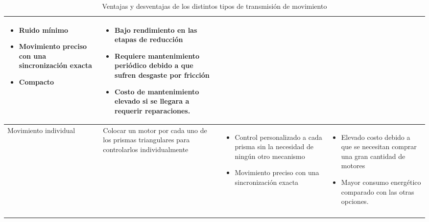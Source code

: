 \begin{center}
\begin{longtable}[!htb]{| m{5em} | m{12em} | m{12em}| m{12em}|}
\begin{itemize}
        \item Ruido mínimo
        \item Movimiento preciso con una sincronización exacta
        \item Compacto
    \end{itemize}
    & 
    \begin{itemize}
        \item Bajo rendimiento en las etapas de reducción
        \item Requiere mantenimiento periódico debido a que sufren desgaste por fricción
        \item Costo de mantenimiento elevado si se llegara a requerir reparaciones.
    \end{itemize}\\
    \hline
    Movimiento individual& Colocar un motor por cada uno de los prismas triangulares para controlarlos individualmente& 
    \begin{itemize}
        \item Control personalizado a cada prisma sin la necesidad de ningún otro mecanismo 
        \item Movimiento preciso con una sincronización exacta
    \end{itemize}
    & 
    \begin{itemize}
        \item Elevado costo debido a que se necesitan comprar una gran cantidad de motores
        \item Mayor consumo energético comparado con las otras opciones.
    \end{itemize}\\
    \hline
    \caption{Ventajas y desventajas de los distintos tipos de transmisi\'on de movimiento}
    \label{tab:ComTransmision}
    \end{longtable}
\end{center}

